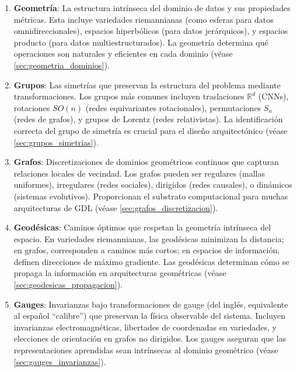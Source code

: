 \begin{enumerate}
    \item \textbf{Geometría}: La estructura intrínseca del dominio de datos y sus propiedades métricas. Esta incluye variedades riemannianas (como esferas para datos omnidireccionales), espacios hiperbólicos (para datos jerárquicos), y espacios producto (para datos multiestructurados). La geometría determina qué operaciones son naturales y eficientes en cada dominio (véase \autoref{sec:geometria_dominios}).

    \item \textbf{Grupos}: Las simetrías que preservan la estructura del problema mediante transformaciones. Los grupos más comunes incluyen traslaciones $\mathbb{R}^d$ (\glspl{CNN}), rotaciones $SO(n)$ (redes equivariantes rotacionales), permutaciones $S_n$ (redes de grafos), y grupos de Lorentz (redes relativistas). La identificación correcta del grupo de simetría es crucial para el diseño arquitectónico (véase \autoref{sec:grupos_simetrias}).

    \item \textbf{Grafos}: Discretizaciones de dominios geométricos continuos que capturan relaciones locales de vecindad. Los grafos pueden ser regulares (mallas uniformes), irregulares (redes sociales), dirigidos (redes causales), o dinámicos (sistemas evolutivos). Proporcionan el substrato computacional para muchas arquitecturas de \gls{GDL} (véase \autoref{sec:grafos_discretizacion}).

    \item \textbf{Geodésicas}: Caminos óptimos que respetan la geometría intrínseca del espacio. En variedades riemannianas, las geodésicas minimizan la distancia; en grafos, corresponden a caminos más cortos; en espacios de información, definen direcciones de máximo gradiente. Las geodésicas determinan cómo se propaga la información en arquitecturas geométricas (véase \autoref{sec:geodesicas_propagacion}).

    \item \textbf{Gauges}: Invarianzas bajo transformaciones de gauge (del inglés, equivalente al español ``calibre'') que preservan la física observable del sistema. Incluyen invarianzas electromagnéticas, libertades de coordenadas en variedades, y elecciones de orientación en grafos no dirigidos. Los gauges aseguran que las representaciones aprendidas sean intrínsecas al dominio geométrico (véase \autoref{sec:gauges_invarianzas}).
\end{enumerate}

